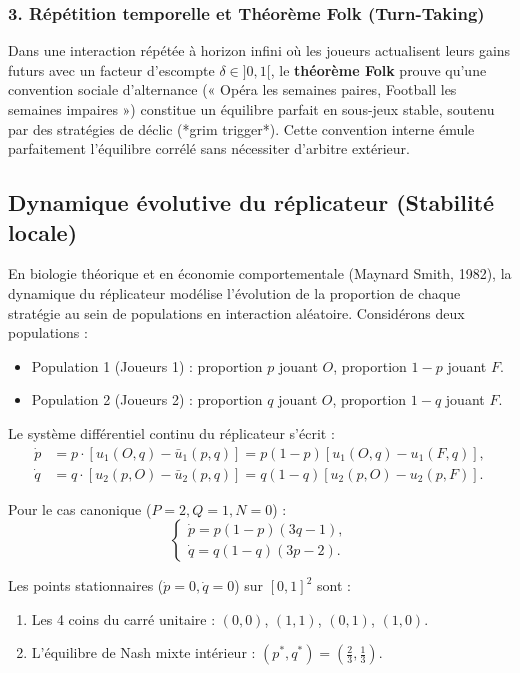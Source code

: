 \documentclass[11pt,a4paper]{article}
\begin{document}
\subsubsection{3. Répétition temporelle et Théorème Folk (Turn-Taking)}
Dans une interaction répétée à horizon infini où les joueurs actualisent leurs gains futurs avec un facteur d'escompte $\delta \in ]0, 1[$, le \textbf{théorème Folk} prouve qu'une convention sociale d'alternance (« Opéra les semaines paires, Football les semaines impaires ») constitue un équilibre parfait en sous-jeux stable, soutenu par des stratégies de déclic (*grim trigger*). Cette convention interne émule parfaitement l'équilibre corrélé sans nécessiter d'arbitre extérieur.

\subsection{Dynamique évolutive du réplicateur (Stabilité locale)}
En biologie théorique et en économie comportementale (Maynard Smith, 1982), la dynamique du réplicateur modélise l'évolution de la proportion de chaque stratégie au sein de populations en interaction aléatoire.
Considérons deux populations :
\begin{itemize}[leftmargin=1.5em]
    \item Population 1 (Joueurs 1) : proportion $p$ jouant $O$, proportion $1-p$ jouant $F$.
    \item Population 2 (Joueurs 2) : proportion $q$ jouant $O$, proportion $1-q$ jouant $F$.
\end{itemize}

Le système différentiel continu du réplicateur s'écrit :
\begin{align}
\dot{p} &= p \cdot \left[ u_1(O, q) - \bar{u}_1(p, q) \right] = p(1 - p) \left[ u_1(O, q) - u_1(F, q) \right], \\
\dot{q} &= q \cdot \left[ u_2(p, O) - \bar{u}_2(p, q) \right] = q(1 - q) \left[ u_2(p, O) - u_2(p, F) \right].
\end{align}

Pour le cas canonique ($P = 2, Q = 1, N = 0$) :
\begin{equation}\label{eq:replicator_system}
\begin{cases}
\dot{p} = p(1 - p)(3q - 1), \\
\dot{q} = q(1 - q)(3p - 2).
\end{cases}
\end{equation}

Les points stationnaires ($\dot{p} = 0, \dot{q} = 0$) sur $[0, 1]^2$ sont :
\begin{enumerate}[label=(\roman*)]
    \item Les 4 coins du carré unitaire : $(0, 0)$, $(1, 1)$, $(0, 1)$, $(1, 0)$.
    \item L'équilibre de Nash mixte intérieur : $(p^*, q^*) = \left(\frac{2}{3}, \frac{1}{3}\right)$.
\end{enumerate}
\end{document}
